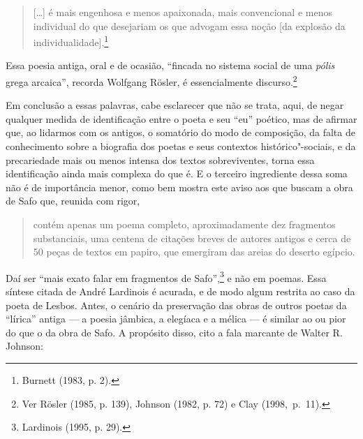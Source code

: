 \begin{quote}
[\ldots{}] é mais engenhosa e menos apaixonada,
mais convencional e menos individual do que desejariam os que advogam essa noção [da explosão da individualidade].\footnote{ Burnett (1983, p. 2).} 
\end{quote}

Essa poesia antiga, oral e de
ocasião, “fincada no sistema social de uma \textit{pólis} grega arcaica”,
recorda Wolfgang Rösler, é essencialmente discurso.\footnote{ Ver
Rösler (1985, p. 139), Johnson (1982, p. 72) e Clay \mbox{(1998, p. 11)}.}

Em conclusão a essas palavras, cabe esclarecer que não se trata, aqui, de negar
qualquer medida de identificação entre o poeta e seu “eu” poético, mas de
afirmar que, ao lidarmos com os antigos, o somatório do modo de composição, da
falta de conhecimento sobre a biografia dos poetas e seus contextos
histórico"-sociais, e da precariedade mais ou menos intensa dos textos
sobreviventes, torna essa identificação ainda mais complexa do que é.
E o terceiro ingrediente dessa soma não é de importância menor, como
bem mostra este aviso aos que buscam a obra de Safo que, reunida com rigor,

\begin{quote}
contém apenas um poema completo, aproximadamente dez fragmentos substanciais,
uma centena de citações breves de autores antigos e cerca de 50 peças de textos
em papiro, que emergiram das areias do deserto egípcio.
\end{quote}

Daí ser “mais exato
falar em fragmentos de Safo”,\footnote{ Lardinois (1995, p. 29).} e não em
poemas. Essa síntese citada de André Lardinois é acurada, e de modo algum restrita ao
caso da poeta de Lesbos.
Antes, o cenário da preservação das obras de outros poetas da “lírica” antiga ---
a poesia jâmbica, a elegíaca e a mélica --- é similar ao ou pior do que
o da obra de Safo. A propósito disso, cito a fala marcante de Walter R. Johnson:

